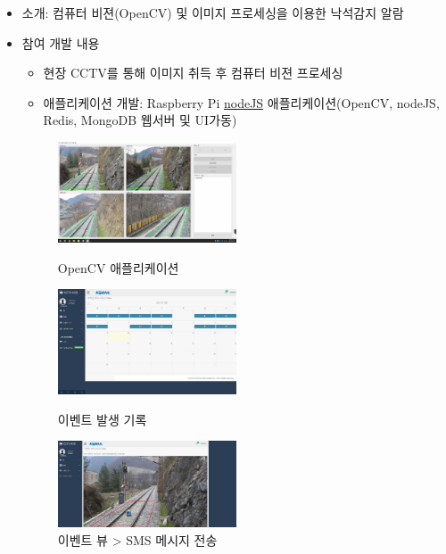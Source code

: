 \documentclass[10pt,a4paper,ragged2e]{altacv}
\begin{document}
\begin{fullwidth}
	\begin{itemize}
		\item
		      소개: 컴퓨터 비젼(OpenCV) 및 이미지 프로세싱을 이용한 낙석감지 알람
		\item 참여 개발 내용
		      \begin{itemize}
			      \item 현장 CCTV를 통해 이미지 취득 후 컴퓨터 비젼 프로세싱
			      \item 애플리케이션 개발: Raspberry Pi \href{https://nodejs.org}{nodeJS} 애플리케이션(OpenCV, nodeJS, Redis, MongoDB 웹서버 및 UI가동)
		      \end{itemize}
		      \begin{figure}[!ht]
			      \begin{fullwidth}
				      \parbox{0.5\textwidth}{
					      \centering
					      \includegraphics[width=0.5\textwidth]{images/korail_aod_01.jpg}
					      \caption*{OpenCV 애플리케이션}
				      }\qquad
				      \parbox{0.5\textwidth}{
					      \centering
					      \includegraphics[width=0.5\textwidth]{images/korail_aod_02.jpg}
					      \caption*{이벤트 발생 기록}
				      }\qquad
				      \parbox{0.5\textwidth}{
					      \centering
					      \includegraphics[width=0.5\textwidth]{images/korail_aod_03_01.png}
					      \caption*{이벤트 뷰 > SMS 메시지 전송}
				      }
			      \end{fullwidth}
		      \end{figure}


\end{itemize}
\end{fullwidth}
\end{document}
